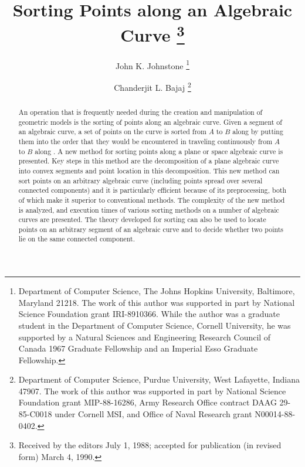 \newcommand{\wwa}{\mbox{$\arc{W_{1}W_{2}}$}}
\newcommand{\wwh}{\mbox{$\widehat{W_{1}W_{2}}$}}
\newcommand{\wo}{\mbox{$W_{1}$}}
\newcommand{\wt}{\mbox{$W_{2}$}}
\newcommand{\param}{{parameterization} }
\newcommand{\wallpoint}{curve point}
\newcommand{\wallpoints}{curve points}
\newcommand{\wall}{wall}
\newcommand{\walls}{walls}
\newcommand{\cellsegment}{cell segment}
\newcommand{\x}{X}
\newcommand{\y}{Y}
\newcommand{\SSo}{{\cal S}}
\newcommand{\SSt}{\mbox{S\hspace{-0.68em}S\hspace{.25em}}}  
%
\title{Sorting Points along an Algebraic Curve%
	\thanks{Received by the editors July 1, 1988;
	accepted for publication (in revised form) March 4, 1990.}}
\author{John K. Johnstone%
    \thanks{Department of Computer Science, The Johns Hopkins University, 
		Baltimore, Maryland 21218.
	The work of this author was supported in part by National Science 
	Foundation grant 
	IRI-8910366.
	While the author was a graduate
	student in the Department of Computer Science, Cornell University, 
	he was supported
	by a Natural Sciences and Engineering
	Research Council of Canada 1967 Graduate 
	Fellowship and an Imperial Esso Graduate Fellowship.}
\and
	Chanderjit L. Bajaj%
	\thanks{Department of Computer Science, Purdue University, 
		West Lafayette, Indiana  47907.
	The work of this author was supported in part by National Science 
	Foundation grant
	MIP-88-16286, 
	Army Research Office contract DAAG 29-85-C0018 under Cornell MSI, 
	and
	Office of Naval Research grant N00014-88-0402.}}

\maketitle

\begin{abstract}
An operation that is frequently needed during the creation and manipulation 
of geometric 
models is the sorting of points along an algebraic curve.
Given a segment  of an algebraic curve, a set of points on the 
curve 
is sorted
from $A$ to $B$ along  by putting them into the order that they 
would be encountered 
in traveling continuously from $A$ to $B$ along .
A new method for sorting points along a plane or space algebraic curve 
is presented.
Key steps in this method are the decomposition of a plane algebraic curve 
into convex 
segments and point location in this decomposition.
This new method can sort points on an arbitrary algebraic curve 
(including points spread over several connected components)
and it is particularly efficient 
because of its preprocessing, both of which make it superior to 
conventional 
methods.
The complexity of the new method is analyzed, and execution times of 
various 
sorting
methods on a number of algebraic curves are presented.
The theory developed for sorting can also be used to locate points on an 
arbitrary 
segment of an algebraic curve and to decide whether two points lie on the 
same 
connected 
component.
\end{abstract}

